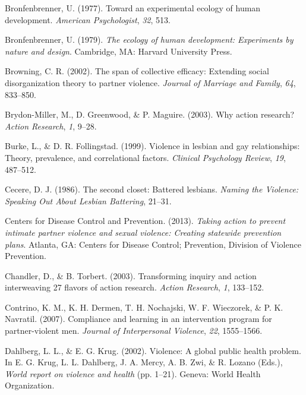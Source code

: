 \documentclass[11pt,]{tufte-book}
\begin{document}
\hypertarget{ref-bronfenbrenner1977toward}{}
Bronfenbrenner, U. (1977). Toward an experimental ecology of human
development. \emph{American Psychologist}, \emph{32}, 513.

\hypertarget{ref-bronfenbrenner1979ecology}{}
Bronfenbrenner, U. (1979). \emph{The ecology of human development:
Experiments by nature and design}. Cambridge, MA: Harvard University
Press.

\hypertarget{ref-browning2002span}{}
Browning, C. R. (2002). The span of collective efficacy: Extending
social disorganization theory to partner violence. \emph{Journal of
Marriage and Family}, \emph{64}, 833--850.

\hypertarget{ref-brydon-miller2003why}{}
Brydon-Miller, M., D. Greenwood, \& P. Maguire. (2003). Why action
research? \emph{Action Research}, \emph{1}, 9--28.

\hypertarget{ref-burke1999violence}{}
Burke, L., \& D. R. Follingstad. (1999). Violence in lesbian and gay
relationships: Theory, prevalence, and correlational factors.
\emph{Clinical Psychology Review}, \emph{19}, 487--512.

\hypertarget{ref-cecere1986second}{}
Cecere, D. J. (1986). The second closet: Battered lesbians. \emph{Naming
the Violence: Speaking Out About Lesbian Battering}, 21--31.

\hypertarget{ref-centers2013taking}{}
Centers for Disease Control and Prevention. (2013). \emph{Taking action
to prevent intimate partner violence and sexual violence: Creating
statewide prevention plans}. Atlanta, GA: Centers for Disease Control;
Prevention, Division of Violence Prevention.

\hypertarget{ref-chandler2003transforming}{}
Chandler, D., \& B. Torbert. (2003). Transforming inquiry and action
interweaving 27 flavors of action research. \emph{Action Research},
\emph{1}, 133--152.

\hypertarget{ref-contrino2007compliance}{}
Contrino, K. M., K. H. Dermen, T. H. Nochajski, W. F. Wieczorek, \& P.
K. Navratil. (2007). Compliance and learning in an intervention program
for partner-violent men. \emph{Journal of Interpersonal Violence},
\emph{22}, 1555--1566.

\hypertarget{ref-dahlberg2002violence}{}
Dahlberg, L. L., \& E. G. Krug. (2002). Violence: A global public health
problem. In E. G. Krug, L. L. Dahlberg, J. A. Mercy, A. B. Zwi, \& R.
Lozano (Eds.), \emph{World report on violence and health} (pp. 1--21).
Geneva: World Health Organization.
\end{document}
